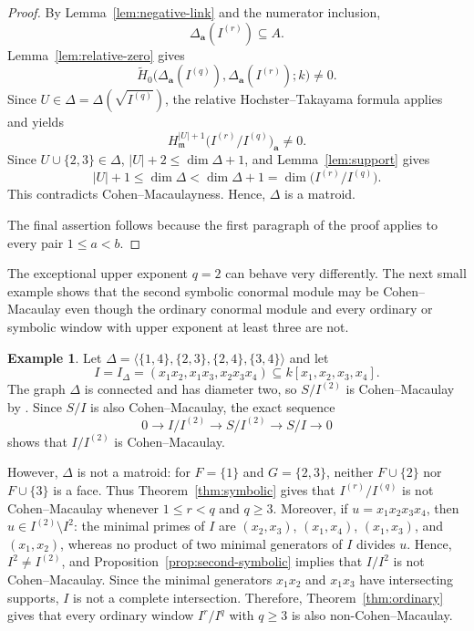 \documentclass[12pt]{amsart}
\theoremstyle{plain}
\theoremstyle{definition}
\newtheorem{example}[theorem]{Example}
\theoremstyle{remark}
\begin{document}
\begin{proof}
By Lemma~\ref{lem:negative-link} and the numerator inclusion,
$$
\Delta_{\mathbf a}(I^{(r)})\subseteq A.
$$
Lemma~\ref{lem:relative-zero} gives
$$
\widetilde H_0
\bigl(\Delta_{\mathbf a}(I^{(q)}),
\Delta_{\mathbf a}(I^{(r)});k\bigr)\neq0.
$$
Since $U\in\Delta=\Delta(\sqrt{I^{(q)}})$, the relative
Hochster--Takayama formula applies and yields
$$
H_{\mathfrak m}^{|U|+1}
\bigl(I^{(r)}/I^{(q)}\bigr)_{\mathbf a}\neq0.
$$
Since $U\cup\{2,3\}\in\Delta$,
$|U|+2\le\dim\Delta+1$, and Lemma~\ref{lem:support} gives
$$
|U|+1\le\dim\Delta<\dim\Delta+1
=\dim\bigl(I^{(r)}/I^{(q)}\bigr).
$$
This contradicts Cohen--Macaulayness. Hence, $\Delta$ is a matroid.

The final assertion follows because the first paragraph of the proof applies
to every pair $1\le a<b$.
\end{proof}

The exceptional upper exponent $q=2$ can behave very differently. The next
small example shows that the second symbolic conormal module may be
Cohen--Macaulay even though the ordinary conormal module and every ordinary or
symbolic window with upper exponent at least three are not.

\begin{example}\label{ex:symbolic-second-exception}
Let
$\Delta=\langle\{1,4\},\{2,3\},\{2,4\},\{3,4\}\rangle$ and let
$$
I=I_\Delta=(x_1x_2,x_1x_3,x_2x_3x_4)
\subseteq k[x_1,x_2,x_3,x_4].
$$
The graph $\Delta$ is connected and has diameter two, so $S/I^{(2)}$ is
Cohen--Macaulay by \cite[Corollary~2.3]{MinhTrung}. Since $S/I$ is also
Cohen--Macaulay, the exact sequence
$$
0\longrightarrow I/I^{(2)}\longrightarrow S/I^{(2)}
\longrightarrow S/I\longrightarrow0
$$
shows that $I/I^{(2)}$ is Cohen--Macaulay.

However, $\Delta$ is not a matroid: for $F=\{1\}$ and $G=\{2,3\}$,
neither $F\cup\{2\}$ nor $F\cup\{3\}$ is a face. Thus
Theorem~\ref{thm:symbolic} gives that
$I^{(r)}/I^{(q)}$ is not Cohen--Macaulay whenever
$1\le r<q$ and $q\ge3$. Moreover, if $u=x_1x_2x_3x_4$, then
$u\in I^{(2)}\setminus I^2$: the minimal primes of $I$ are
$(x_2,x_3)$, $(x_1,x_4)$, $(x_1,x_3)$, and $(x_1,x_2)$, whereas no product of
two minimal generators of $I$ divides $u$. Hence, $I^2\neq I^{(2)}$, and
Proposition~\ref{prop:second-symbolic} implies that $I/I^2$ is not
Cohen--Macaulay. Since the minimal generators $x_1x_2$ and $x_1x_3$ have
intersecting supports, $I$ is not a complete intersection. Therefore,
Theorem~\ref{thm:ordinary} gives that every ordinary window $I^r/I^q$ with
$q\ge3$ is also non-Cohen--Macaulay.
\end{example}
\end{document}
